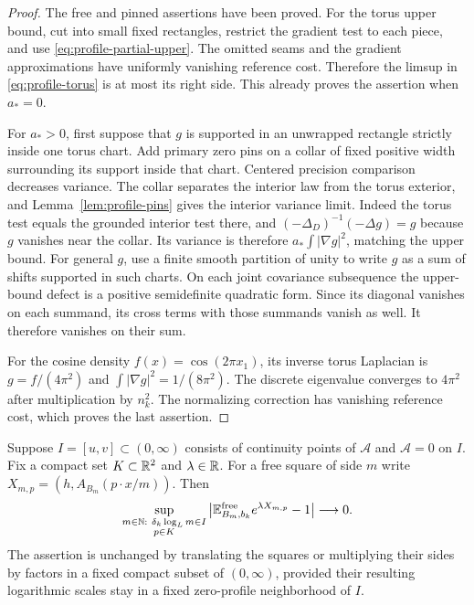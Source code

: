 \begin{proof}
The free and pinned assertions have been proved. For the torus upper
bound, cut into small fixed rectangles, restrict the gradient test to
each piece, and use \eqref{eq:profile-partial-upper}. The omitted seams
and the gradient approximations have uniformly vanishing reference
cost. Therefore the limsup in \eqref{eq:profile-torus} is at most its
right side. This already proves the assertion when $a_*=0$.

For $a_*>0$, first suppose that $g$ is supported in an unwrapped
rectangle strictly inside one torus chart. Add primary zero pins on a
collar of fixed positive width surrounding its support inside that
chart. Centered precision comparison decreases variance. The collar
separates the interior law from the torus exterior, and
Lemma~\ref{lem:profile-pins} gives the interior variance limit.
Indeed the torus test equals the grounded interior test there, and
$(-\Delta_D)^{-1}(-\Delta g)=g$ because $g$ vanishes near the
collar. Its variance is therefore $a_*\int|\nabla g|^2$, matching
the upper bound. For general $g$,
use a finite smooth partition of unity to write $g$ as a sum of shifts
supported in such charts. On each joint covariance subsequence the
upper-bound defect is a positive semidefinite quadratic form. Since
its diagonal vanishes on each summand, its cross terms with those
summands vanish as well. It therefore vanishes on their sum.

For the cosine density $f(x)=\cos(2\pi x_1)$, its inverse torus
Laplacian is $g=f/(4\pi^2)$ and
$\int|\nabla g|^2=1/(8\pi^2)$. The discrete eigenvalue converges to
$4\pi^2$ after multiplication by $n_k^2$. The normalizing correction
has vanishing reference cost, which proves the last assertion.
\end{proof}

\begin{corollary}
\label{cor:profile-zero-uniform}
Suppose $I=[u,v]\subset(0,\infty)$ consists of continuity points of
$\mathcal A$ and $\mathcal A=0$ on $I$. Fix a compact set
$K\subset\mathbb R^2$ and $\lambda\in\mathbb R$. For a free square of side $m$
write $X_{m,p}=(h,A_{B_m}(p\cdot x/m))$. Then
\begin{equation}\label{eq:profile-zero-uniform}
 \sup_{\substack{m\in\mathbb N:\ \delta_k\log_Lm\in I\\p\in K}}
 \left|\mathbb E_{B_m,b_k}^{\mathrm{free}}e^{\lambda X_{m,p}}-1\right|
                                      \longrightarrow0.
\end{equation}
The assertion is unchanged by translating the squares or multiplying
their sides by factors in a fixed compact subset of $(0,\infty)$,
provided their resulting logarithmic scales stay in a fixed
zero-profile neighborhood of $I$.
\end{corollary}

